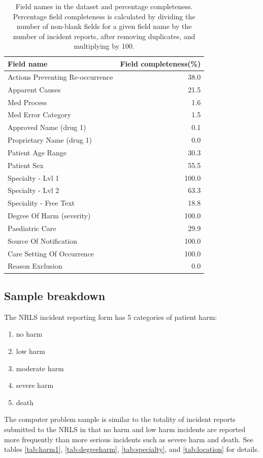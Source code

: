 \begin{table}[htbp]\centering
\begin{tabular}{lr}
\toprule
\textbf{Field name} & \textbf{Field completeness{(\%)}}\\
\midrule
Actions Preventing Re-occurrence & 38.0 \\
Apparent Causes & 21.5 \\
Med Process & 1.6 \\
Med Error Category & 1.5 \\
Approved Name (drug 1) & 0.1 \\
Proprietary Name (drug 1) & 0.0	\\
Patient Age Range & 30.3	\\
Patient Sex & 55.5	\\
Specialty - Lvl 1 & 100.0 \\
Specialty - Lvl 2 & 63.3	\\
Speciality - Free Text & 18.8\\	
Degree Of Harm (severity) & 100.0\\
Paediatric Care & 29.9 \\
Source Of Notification & 100.0\\
Care Setting Of Occurrence & 100.0 \\
Reason Exclusion & 0.0\\
\bottomrule
\end{tabular}
\caption{Field names in the dataset and percentage completeness. Percentage field completeness is calculated by dividing the number of non-blank fields for a given field name by the number of incident reports, after removing duplicates, and multiplying by 100.}
\label{tab:field_names2}
\end{table}

\subsection{Sample breakdown}
The NRLS incident reporting form has 5 categories of patient harm: 

\begin{enumerate}
 \item no harm
 \item low harm
 \item moderate harm
 \item severe harm
 \item death
\end{enumerate}

The computer problem sample is similar to the totality of incident reports submitted to the NRLS in that no harm and low harm incidents are reported more frequently than more serious incidents such as severe harm and death. See tables \ref{tab:harm1}, \ref{tab:degreeharm}, \ref{tab:specialty}, and \ref{tab:location} for details. 


